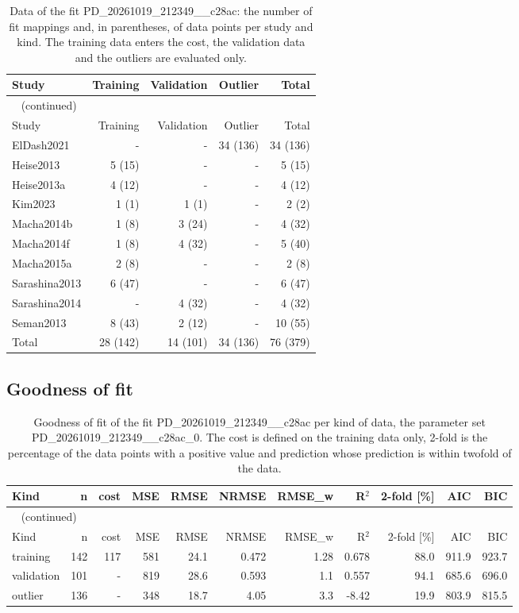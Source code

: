 \begin{longtable}{lrrrr}
\caption{Data of the fit PD\_20261019\_212349\_\_c28ac: the number of fit mappings and, in parentheses, of data points per study and kind. The training data enters the cost, the validation data and the outliers are evaluated only.}\label{tab:data:PD_20261019_212349__c28ac} \\
\toprule
Study & Training & Validation & Outlier & Total \\
\midrule
\endfirsthead
\multicolumn{5}{l}{\small\tablename~\thetable{} (continued)} \\
\toprule
Study & Training & Validation & Outlier & Total \\
\midrule
\endhead
\bottomrule
\endlastfoot
ElDash2021 & - & - & 34 (136) & 34 (136) \\
Heise2013 & 5 (15) & - & - & 5 (15) \\
Heise2013a & 4 (12) & - & - & 4 (12) \\
Kim2023 & 1 (1) & 1 (1) & - & 2 (2) \\
Macha2014b & 1 (8) & 3 (24) & - & 4 (32) \\
Macha2014f & 1 (8) & 4 (32) & - & 5 (40) \\
Macha2015a & 2 (8) & - & - & 2 (8) \\
Sarashina2013 & 6 (47) & - & - & 6 (47) \\
Sarashina2014 & - & 4 (32) & - & 4 (32) \\
Seman2013 & 8 (43) & 2 (12) & - & 10 (55) \\
Total & 28 (142) & 14 (101) & 34 (136) & 76 (379) \\
\end{longtable}

\subsection{Goodness of fit}

\begin{longtable}{lrrrrrrrrrr}
\caption{Goodness of fit of the fit PD\_20261019\_212349\_\_c28ac per kind of data, the parameter set PD\_20261019\_212349\_\_c28ac\_0. The cost is defined on the training data only, 2-fold is the percentage of the data points with a positive value and prediction whose prediction is within twofold of the data.}\label{tab:metrics:PD_20261019_212349__c28ac} \\
\toprule
Kind & n & cost & MSE & RMSE & NRMSE & RMSE\_w & R\ensuremath{^{2}} & 2-fold [\%] & AIC & BIC \\
\midrule
\endfirsthead
\multicolumn{11}{l}{\small\tablename~\thetable{} (continued)} \\
\toprule
Kind & n & cost & MSE & RMSE & NRMSE & RMSE\_w & R\ensuremath{^{2}} & 2-fold [\%] & AIC & BIC \\
\midrule
\endhead
\bottomrule
\endlastfoot
training & 142 & 117 & 581 & 24.1 & 0.472 & 1.28 & 0.678 & 88.0 & 911.9 & 923.7 \\
validation & 101 & - & 819 & 28.6 & 0.593 & 1.1 & 0.557 & 94.1 & 685.6 & 696.0 \\
outlier & 136 & - & 348 & 18.7 & 4.05 & 3.3 & -8.42 & 19.9 & 803.9 & 815.5 \\
\end{longtable}

